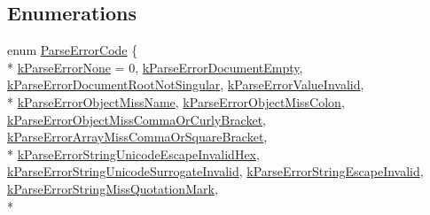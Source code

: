 \subsection*{Enumerations}
\begin{DoxyCompactItemize}
\item 
enum \hyperlink{group___r_a_p_i_d_j_s_o_n___e_r_r_o_r_s_ga8d4b32dfc45840bca189ade2bbcb6ba7}{Parse\+Error\+Code} \{ \\*
\hyperlink{group___r_a_p_i_d_j_s_o_n___e_r_r_o_r_s_gga8d4b32dfc45840bca189ade2bbcb6ba7ac0856bac4945cbd1d09e9502fd8f852f}{k\+Parse\+Error\+None} = 0, 
\hyperlink{group___r_a_p_i_d_j_s_o_n___e_r_r_o_r_s_gga8d4b32dfc45840bca189ade2bbcb6ba7a04b368d184e84b50580be2faa55f738a}{k\+Parse\+Error\+Document\+Empty}, 
\hyperlink{group___r_a_p_i_d_j_s_o_n___e_r_r_o_r_s_gga8d4b32dfc45840bca189ade2bbcb6ba7a2293b39033220f4c2a568482c497dab5}{k\+Parse\+Error\+Document\+Root\+Not\+Singular}, 
\hyperlink{group___r_a_p_i_d_j_s_o_n___e_r_r_o_r_s_gga8d4b32dfc45840bca189ade2bbcb6ba7a20a50e257aab726699ab02192db72ba9}{k\+Parse\+Error\+Value\+Invalid}, 
\\*
\hyperlink{group___r_a_p_i_d_j_s_o_n___e_r_r_o_r_s_gga8d4b32dfc45840bca189ade2bbcb6ba7ae3142fbadf2c4cdfd0c7200d7b6b8ed3}{k\+Parse\+Error\+Object\+Miss\+Name}, 
\hyperlink{group___r_a_p_i_d_j_s_o_n___e_r_r_o_r_s_gga8d4b32dfc45840bca189ade2bbcb6ba7a55cda7eb30436986ab42a61e06caf017}{k\+Parse\+Error\+Object\+Miss\+Colon}, 
\hyperlink{group___r_a_p_i_d_j_s_o_n___e_r_r_o_r_s_gga8d4b32dfc45840bca189ade2bbcb6ba7a34f70d7ed2fa121954f5fc5b5113d05f}{k\+Parse\+Error\+Object\+Miss\+Comma\+Or\+Curly\+Bracket}, 
\hyperlink{group___r_a_p_i_d_j_s_o_n___e_r_r_o_r_s_gga8d4b32dfc45840bca189ade2bbcb6ba7abfdd2bd90134fec4fe6a22762d16a5f5}{k\+Parse\+Error\+Array\+Miss\+Comma\+Or\+Square\+Bracket}, 
\\*
\hyperlink{group___r_a_p_i_d_j_s_o_n___e_r_r_o_r_s_gga8d4b32dfc45840bca189ade2bbcb6ba7afc65ea941a0a26812f0f258d2429e5d2}{k\+Parse\+Error\+String\+Unicode\+Escape\+Invalid\+Hex}, 
\hyperlink{group___r_a_p_i_d_j_s_o_n___e_r_r_o_r_s_gga8d4b32dfc45840bca189ade2bbcb6ba7ad9fced6763a06435ca448626c74e5c72}{k\+Parse\+Error\+String\+Unicode\+Surrogate\+Invalid}, 
\hyperlink{group___r_a_p_i_d_j_s_o_n___e_r_r_o_r_s_gga8d4b32dfc45840bca189ade2bbcb6ba7a98bb3f3b1e12fdb7f278b9fa4029306f}{k\+Parse\+Error\+String\+Escape\+Invalid}, 
\hyperlink{group___r_a_p_i_d_j_s_o_n___e_r_r_o_r_s_gga8d4b32dfc45840bca189ade2bbcb6ba7a6369e5b4e4922720cbc45c5941efc4af}{k\+Parse\+Error\+String\+Miss\+Quotation\+Mark}, 
\\*

\end{DoxyCompactItemize}
